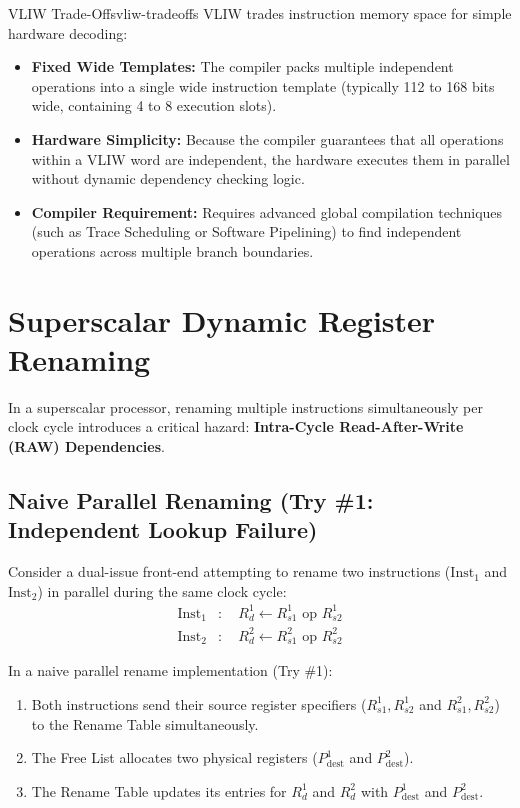 \begin{concept}{VLIW Trade-Offs}{vliw-tradeoffs}
VLIW trades instruction memory space for simple hardware decoding:
\begin{itemize}
    \item \textbf{Fixed Wide Templates:} The compiler packs multiple independent operations into a single wide instruction template (typically 112 to 168 bits wide, containing 4 to 8 execution slots).
    \item \textbf{Hardware Simplicity:} Because the compiler guarantees that all operations within a VLIW word are independent, the hardware executes them in parallel without dynamic dependency checking logic.
    \item \textbf{Compiler Requirement:} Requires advanced global compilation techniques (such as Trace Scheduling or Software Pipelining) to find independent operations across multiple branch boundaries.
\end{itemize}
\end{concept}

\section{Superscalar Dynamic Register Renaming}
\label{sec:superscalar_register_renaming}

In a superscalar processor, renaming multiple instructions simultaneously per clock cycle introduces a critical hazard: \textbf{Intra-Cycle Read-After-Write (RAW) Dependencies}.

\subsection{Naive Parallel Renaming (Try \#1: Independent Lookup Failure)}

Consider a dual-issue front-end attempting to rename two instructions ($\text{Inst}_1$ and $\text{Inst}_2$) in parallel during the same clock cycle:
\begin{align*}
\text{Inst}_1&: \quad R_d^1 \leftarrow R_{s1}^1 \text{ op } R_{s2}^1 \\
\text{Inst}_2&: \quad R_d^2 \leftarrow R_{s1}^2 \text{ op } R_{s2}^2
\end{align*}

In a naive parallel rename implementation (Try \#1):
\begin{enumerate}
    \item Both instructions send their source register specifiers ($R_{s1}^1, R_{s2}^1$ and $R_{s1}^2, R_{s2}^2$) to the Rename Table simultaneously.
    \item The Free List allocates two physical registers ($P_{\text{dest}}^1$ and $P_{\text{dest}}^2$).
    \item The Rename Table updates its entries for $R_d^1$ and $R_d^2$ with $P_{\text{dest}}^1$ and $P_{\text{dest}}^2$.
\end{enumerate}

